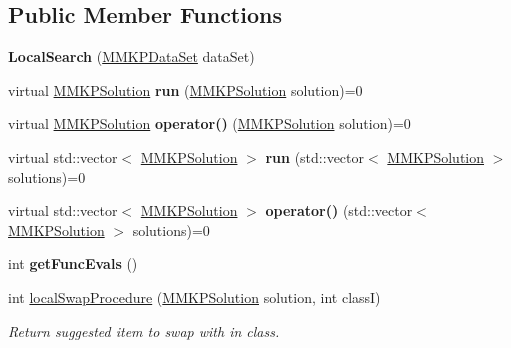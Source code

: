 \subsection*{Public Member Functions}
\begin{DoxyCompactItemize}
\item 
\hypertarget{class_local_search_adccdaf59933abb8a424793f956e54c43}{{\bfseries Local\+Search} (\hyperlink{class_m_m_k_p_data_set}{M\+M\+K\+P\+Data\+Set} data\+Set)}\label{class_local_search_adccdaf59933abb8a424793f956e54c43}

\item 
\hypertarget{class_local_search_a6b488ab257f0ffe0ac10cbe1f692e4aa}{virtual \hyperlink{class_m_m_k_p_solution}{M\+M\+K\+P\+Solution} {\bfseries run} (\hyperlink{class_m_m_k_p_solution}{M\+M\+K\+P\+Solution} solution)=0}\label{class_local_search_a6b488ab257f0ffe0ac10cbe1f692e4aa}

\item 
\hypertarget{class_local_search_aeebd371e5b37af331073986dc96e5c24}{virtual \hyperlink{class_m_m_k_p_solution}{M\+M\+K\+P\+Solution} {\bfseries operator()} (\hyperlink{class_m_m_k_p_solution}{M\+M\+K\+P\+Solution} solution)=0}\label{class_local_search_aeebd371e5b37af331073986dc96e5c24}

\item 
\hypertarget{class_local_search_a433e85206da65205ccef5a8af46835b5}{virtual std\+::vector$<$ \hyperlink{class_m_m_k_p_solution}{M\+M\+K\+P\+Solution} $>$ {\bfseries run} (std\+::vector$<$ \hyperlink{class_m_m_k_p_solution}{M\+M\+K\+P\+Solution} $>$ solutions)=0}\label{class_local_search_a433e85206da65205ccef5a8af46835b5}

\item 
\hypertarget{class_local_search_ad1b39f9c68fdec511b5b90053fff1e4e}{virtual std\+::vector$<$ \hyperlink{class_m_m_k_p_solution}{M\+M\+K\+P\+Solution} $>$ {\bfseries operator()} (std\+::vector$<$ \hyperlink{class_m_m_k_p_solution}{M\+M\+K\+P\+Solution} $>$ solutions)=0}\label{class_local_search_ad1b39f9c68fdec511b5b90053fff1e4e}

\item 
\hypertarget{class_local_search_a2e7afbdfe110f69eb9188c21747705d8}{int {\bfseries get\+Func\+Evals} ()}\label{class_local_search_a2e7afbdfe110f69eb9188c21747705d8}

\item 
int \hyperlink{class_local_search_aecf4a872e2cb71ccaa489dad2c32dc6f}{local\+Swap\+Procedure} (\hyperlink{class_m_m_k_p_solution}{M\+M\+K\+P\+Solution} solution, int class\+I)
\begin{DoxyCompactList}\small\item\em Return suggested item to swap with in class. \end{DoxyCompactList}\end{DoxyCompactItemize}

